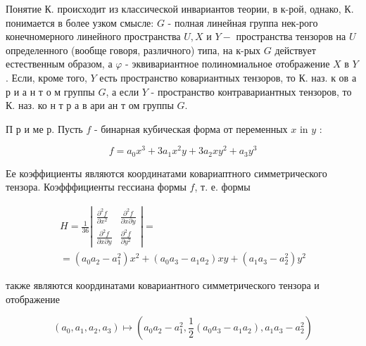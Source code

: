 \documentclass[10pt]{article}
\begin{document}
Понятие К. происходит из классической инвариантов теории, в к-рой, однако, К. понимается в более узком смысле: $G$ - полная линейная группа нек-рого конечномерного линейного пространства $U, X$ и $Y-$ пространства тензоров на $U$ определенного (вообще говоря, различного) типа, на к-рых $G$ действует естественным образом, а $\varphi$ - эквивариантное полиномиальное отображение $X$ в $Y$. Если, кроме того, $Y$ есть пространство ковариантных тензоров, то К. наз. к ов а р и а н т о м группы $G$, а если $Y$ - пространство контравариантных тензоров, то К. наз. ко н т р а в ари ан т ом группы $G$.



П р и ме р. Пусть $f$ - бинарная кубическая форма от переменных $x$ in $y$ :



\[

f=a_{0} x^{3}+3 a_{1} x^{2} y+3 a_{2} x y^{2}+a_{3} y^{3}

\]



Ее коэффициенты являются координатами ковариаптного симметрического тензора. Коэфффициенты гессиана формы $f$, т. е. формы



\[

\begin{gathered}

H=\frac{1}{36}\left|\begin{array}{cc}

\frac{\partial^{2} f}{\partial x^{2}} & \frac{\partial^{2} f}{\partial x \partial y} \\

\frac{\partial^{2} f}{\partial x \partial y} & \frac{\partial^{2} f}{\partial y^{2}}

\end{array}\right|= \\

=\left(a_{0} a_{2}-a_{1}^{2}\right) x^{2}+\left(a_{0} a_{3}-a_{1} a_{2}\right) x y+\left(a_{1} a_{3}-a_{2}^{2}\right) y^{2}

\end{gathered}

\]



также являются координатами ковариантного симметрического тензора и отображение



\[

\left(a_{0}, a_{1}, a_{2}, a_{3}\right) \longmapsto\left(a_{0} a_{2}-a_{1}^{2}, \frac{1}{2}\left(a_{0} a_{3}-a_{1} a_{2}\right), a_{1} a_{3}-a_{2}^{2}\right)

\]
\end{document}
